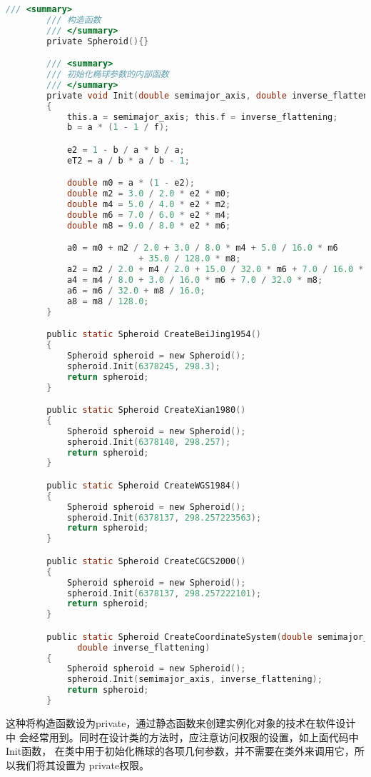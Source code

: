  \begin{lstlisting}[language=C]
        /// <summary>
        /// 构造函数
        /// </summary>
        private Spheroid(){}

        /// <summary>
        /// 初始化椭球参数的内部函数
        /// </summary>
        private void Init(double semimajor_axis, double inverse_flattening)
        {
            this.a = semimajor_axis; this.f = inverse_flattening;
            b = a * (1 - 1 / f);

            e2 = 1 - b / a * b / a;
            eT2 = a / b * a / b - 1;

            double m0 = a * (1 - e2);
            double m2 = 3.0 / 2.0 * e2 * m0;
            double m4 = 5.0 / 4.0 * e2 * m2;
            double m6 = 7.0 / 6.0 * e2 * m4;
            double m8 = 9.0 / 8.0 * e2 * m6;

            a0 = m0 + m2 / 2.0 + 3.0 / 8.0 * m4 + 5.0 / 16.0 * m6
                          + 35.0 / 128.0 * m8;
            a2 = m2 / 2.0 + m4 / 2.0 + 15.0 / 32.0 * m6 + 7.0 / 16.0 * m8;
            a4 = m4 / 8.0 + 3.0 / 16.0 * m6 + 7.0 / 32.0 * m8;
            a6 = m6 / 32.0 + m8 / 16.0;
            a8 = m8 / 128.0;
        }

        public static Spheroid CreateBeiJing1954()
        {
            Spheroid spheroid = new Spheroid();
            spheroid.Init(6378245, 298.3);
            return spheroid;
        }

        public static Spheroid CreateXian1980()
        {
            Spheroid spheroid = new Spheroid();
            spheroid.Init(6378140, 298.257);
            return spheroid;
        }

        public static Spheroid CreateWGS1984()
        {
            Spheroid spheroid = new Spheroid();
            spheroid.Init(6378137, 298.257223563);
            return spheroid;
        }

        public static Spheroid CreateCGCS2000()
        {
            Spheroid spheroid = new Spheroid();
            spheroid.Init(6378137, 298.257222101);
            return spheroid;
        }

        public static Spheroid CreateCoordinateSystem(double semimajor_axis,
              double inverse_flattening)
        {
            Spheroid spheroid = new Spheroid();
            spheroid.Init(semimajor_axis, inverse_flattening);
            return spheroid;
        }
\end{lstlisting}

这种将构造函数设为private，通过静态函数来创建实例化对象的技术在软件设计中
会经常用到。同时在设计类的方法时，应注意访问权限的设置，如上面代码中Init函数，
在类中用于初始化椭球的各项几何参数，并不需要在类外来调用它，所以我们将其设置为
private权限。

